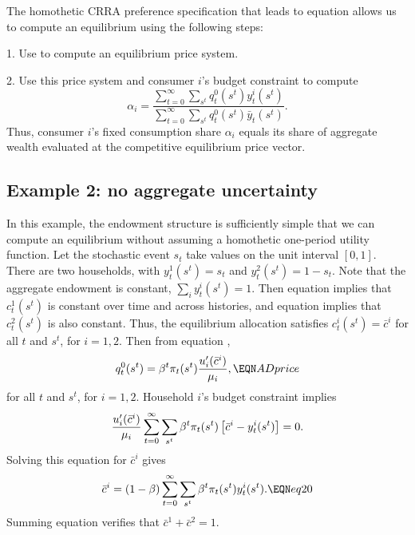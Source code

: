 The homothetic CRRA preference specification that leads to equation  allows us to compute an equilibrium
using the following steps:
\medskip
\item{1.} Use  to compute an equilibrium price system.

\medskip
\item{2.} Use this price system and consumer $i$'s budget constraint to compute
$$ \alpha_i = {\frac {\sum_{t=0}^\infty \sum_{s^t} q_t^0(s^t) y_t^i(s^t) } {\sum_{t=0}^\infty \sum_{s^t} q_t^0(s^t) \bar y_t(s^t)  } } .$$
Thus, consumer $i$'s fixed consumption share $\alpha_i$ equals its share of aggregate wealth evaluated at the competitive  equilibrium price vector.



\subsection{Example 2: no aggregate uncertainty}\label{sec:example2GG}%
In this example, the endowment structure is sufficiently simple that we can compute an equilibrium without assuming a homothetic
one-period utility function. Let the stochastic event $s_t$ take values on the unit interval
$[0,1]$.  There are two households, with $ y_t^1(s^t) =s_t$ and
$y_t^2(s^t) =1-s_t$.  Note that the aggregate endowment is
constant, $\sum_i y_t^i(s^t) =1$.  Then equation  implies
that $c_t^1(s^t)$ is constant over time and across histories, and
equation  implies that $c_t^2(s^t)$ is also constant.
Thus, the equilibrium allocation satisfies
$c_t^i(s^t) = \bar c^i$ for all $t$ and $s^t$, for $i=1,2$.  Then
from equation ,
$$ q_t^0(s^t) = \beta^t \pi_t(s^t) {u'_i(\bar c^i) \over \mu_i}, \EQN ADprice $$
for all $t$ and $s^t$, for $i=1,2$.  Household $i$'s budget constraint
implies
 $$ {u'_i(\bar c^i) \over \mu_i} \sum_{t=0}^\infty \sum_{s^t} \beta^t \pi_t(s^t)
\left[\bar c^i - y_t^i(s^t)\right] = 0 .$$ Solving this equation
for $\bar c^i$ gives
$$ \bar c^i =( 1 -\beta) \sum_{t=0}^\infty \sum_{s^t} \beta^t \pi_t(s^t) y_t^i(s^t) .
      \EQN eq20 $$
Summing equation   verifies that $\bar c^1 + \bar c^2
=1$.


